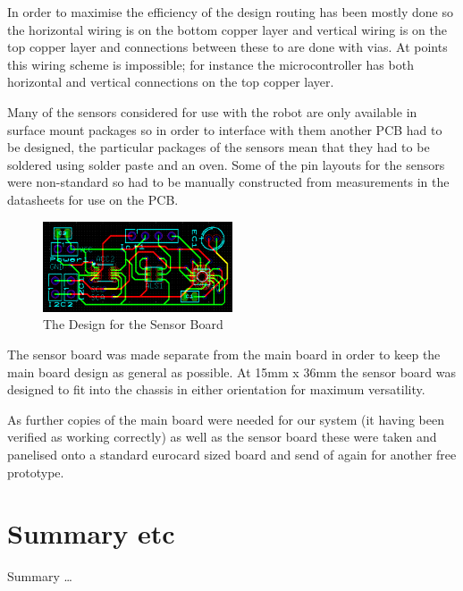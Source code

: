 In order to maximise the efficiency of the design routing has been mostly done so the horizontal wiring is on the bottom copper layer and vertical wiring is on the top copper layer and connections between these to are done with vias. At points this wiring scheme is impossible; for instance the microcontroller has both horizontal and vertical connections on the top copper layer.

Many of the sensors considered for use with the robot are only available in surface mount packages so in order to interface with them another PCB had to be designed, the particular packages of the sensors mean that they had to be soldered using solder paste and an oven. Some of the pin layouts for the sensors were non-standard so had to be manually constructed from measurements in the datasheets for use on the PCB.

\begin{figure}[!htb]
  	\centering
  	\includegraphics[width=0.5\textwidth]{Figures/SensorPCBDesign.png}
  	\caption{The Design for the Sensor Board}
 	\label{Figure:SensorPCBDesign}
\end{figure}

The sensor board was made separate from the main board in order to keep the main board design as general as possible. At 15mm x 36mm the sensor board was designed to fit into the chassis in either orientation for maximum versatility.

As further copies of the main board were needed for our system (it having been verified as working correctly) as well as the sensor board these were taken and panelised onto a standard eurocard sized board and send of again for another free prototype.


\section{Summary etc}
Summary \dots